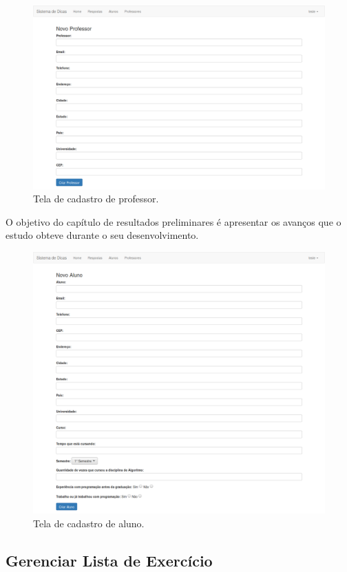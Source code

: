 \begin{figure}[]
	\centering
	\captionsetup{justification=centering}
	\includegraphics[width=.8\linewidth]{imagenssoftware/cadastroprofessor.png}
	\caption{Tela de cadastro de professor.}
	\label{figura:cadastroprofessor}
\end{figure}
 O objetivo do capítulo de resultados preliminares é apresentar os avanços que o estudo obteve durante o seu desenvolvimento.
\begin{figure}[]		
	\centering
	\captionsetup{justification=centering}
	\includegraphics[width=.8\linewidth]{imagenssoftware/cadastroaluno.png}
	\caption{Tela de cadastro de aluno.}
	\label{figura:cadastroaluno}
\end{figure}

\frontmatter

\subsection{Gerenciar Lista de Exercício}

